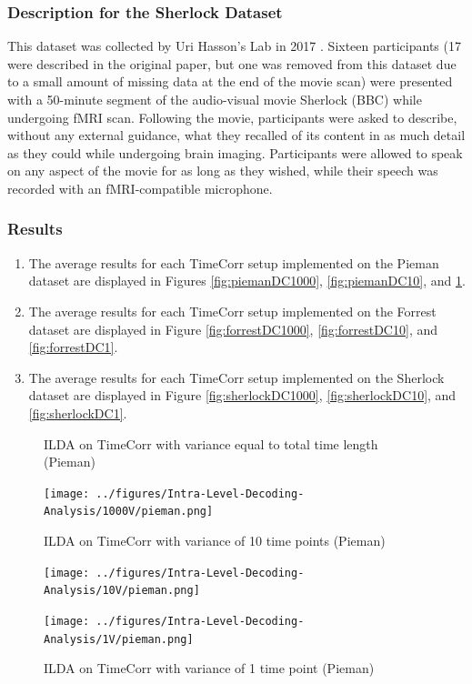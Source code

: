 \documentclass[11pt]{article}
\begin{document}
\subsubsection{Description for the Sherlock Dataset}
This dataset was collected by Uri Hasson's Lab in 2017 \citep{Chen2017}. Sixteen participants (17 were described in the original paper, but one was removed from this dataset due to a small amount of missing data at the end of the movie scan) were presented with a 50-minute segment of the audio-visual movie Sherlock (BBC) while undergoing fMRI scan. Following the movie, participants were asked to describe, without any external guidance, what they recalled of its content in as much detail as they could while undergoing brain imaging. Participants were allowed to speak on any aspect of the movie for as long as they wished, while their speech was recorded with an fMRI-compatible microphone.

\subsubsection{Results}
\begin{enumerate}
\item The average results for each TimeCorr setup implemented on the Pieman dataset are displayed in Figures \ref{fig:piemanDC1000}, \ref{fig:piemanDC10}, and \ref{fig:piemanDC1}.
\item The average results for each TimeCorr setup implemented on the Forrest dataset are displayed in Figure \ref{fig:forrestDC1000}, \ref{fig:forrestDC10}, and \ref{fig:forrestDC1}.
\item The average results for each TimeCorr setup implemented on the Sherlock dataset are displayed in Figure \ref{fig:sherlockDC1000}, \ref{fig:sherlockDC10}, and \ref{fig:sherlockDC1}.
\end{enumerate}

\begin{figure}[!htb]
\caption{ILDA on TimeCorr with variance equal to total time length (Pieman)}
\centering
\texttt{[image: ../figures/Intra-Level-Decoding-Analysis/1000V/pieman.png]}
\label{fig:piemanDC1000}
\caption{ILDA on TimeCorr with variance of 10 time points (Pieman)}
\centering
\texttt{[image: ../figures/Intra-Level-Decoding-Analysis/10V/pieman.png]}
\label{fig:piemanDC10}
\caption{ILDA on TimeCorr with variance of 1 time point (Pieman)}
\centering
\texttt{[image: ../figures/Intra-Level-Decoding-Analysis/1V/pieman.png]}
\label{fig:piemanDC1}
\end{figure}
\end{document}
